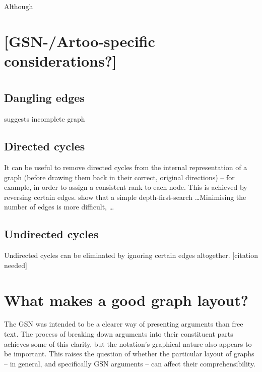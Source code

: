 Although 



\section{[GSN-/Artoo-specific considerations?]}


\section{}



\subsection{Dangling edges}

suggests incomplete graph



\subsection{Directed cycles}

It can be useful to remove directed cycles from the internal representation of a graph
(before drawing them back in their correct, original directions)
-- for example, in order to assign a consistent rank to each node.
This is achieved by reversing certain edges.
\citet{gansner1993} show that a simple depth-first-search \ldots  Minimising the number of edges is more difficult, \citeauthor{gansner1993} \ldots



\subsection{Undirected cycles}

Undirected cycles can be eliminated by ignoring certain edges altogether.  [citation needed]



\section{What makes a good graph layout?}

The GSN was intended to be a clearer way of presenting arguments than free text.
The process of breaking down arguments into their constituent parts achieves some of this clarity,
but the notation's graphical nature also appears to be important.
This raises the question of whether the particular layout of graphs -- in general, and specifically GSN arguments -- can affect their comprehensibility.

